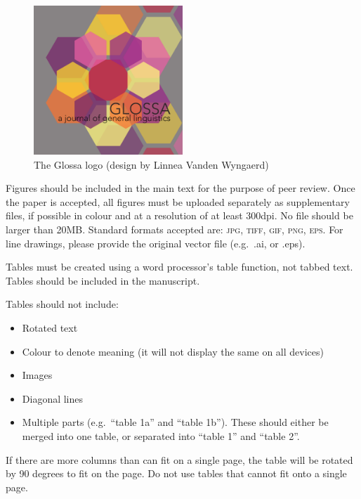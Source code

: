 \documentclass[cm,linguex]{glossa}
\begin{document}
\begin{figure}

{\centering \includegraphics[width=0.5\textwidth]{glossa} 

}

\caption{The Glossa logo (design by Linnea Vanden Wyngaerd)}\label{fig:fig-glossa}
\end{figure}

Figures should be included in the main text for the purpose of peer
review. Once the paper is accepted, all figures must be uploaded
separately as supplementary files, if possible in colour and at a
resolution of at least 300dpi. No file should be larger than 20MB.
Standard formats accepted are: \textsc{jpg, tiff, gif, png, eps}. For
line drawings, please provide the original vector file (e.g.~.ai, or
.eps).

Tables must be created using a word processor's table function, not
tabbed text. Tables should be included in the manuscript.

Tables should not include:

\begin{itemize}
\item
  Rotated text
\item
  Colour to denote meaning (it will not display the same on all devices)
\item
  Images
\item
  Diagonal lines
\item
  Multiple parts (e.g.~``table 1a'' and ``table 1b''). These should
  either be merged into one table, or separated into ``table 1'' and
  ``table 2''.
\end{itemize}

If there are more columns than can fit on a single page, the table will
be rotated by 90 degrees to fit on the page. Do not use tables that
cannot fit onto a single page.
\end{document}
